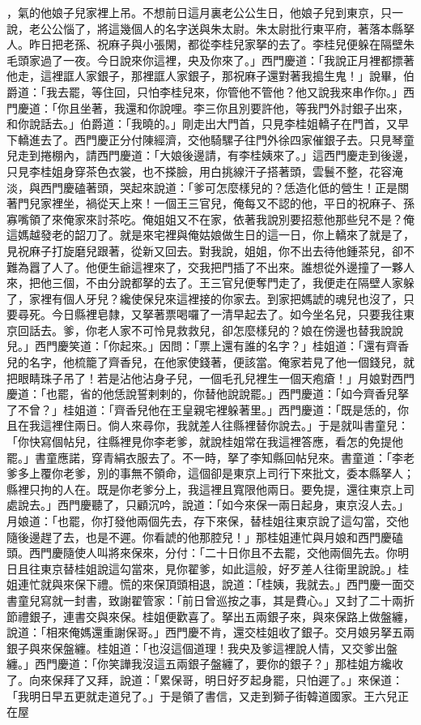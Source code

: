 \begin{showcontents}{}
，氣的他娘子兒家裡上吊。不想前日這月裏老公公生日，他娘子兒到東京，只一說，老公公惱了，將這幾個人的名字送與朱太尉。朱太尉批行東平府，著落本縣拏人。昨日把老孫、祝麻子與小張閑，都從李桂兒家拏的去了。李桂兒便躲在隔壁朱毛頭家過了一夜。今日說來你這裡，央及你來了。」西門慶道：「我說正月裡都摽著他走，這裡誆人家銀子，那裡誆人家銀子，那祝麻子還對著我搗生鬼！」說畢，伯爵道：「我去罷，等住回，只怕李桂兒來，你管他不管他？他又說我來串作你。」西門慶道：「你且坐著，我還和你說哩。李三你且別要許他，等我門外討銀子出來，和你說話去。」伯爵道：「我曉的。」剛走出大門首，只見李桂姐轎子在門首，又早下轎進去了。西門慶正分付陳經濟，交他騎騾子往門外徐四家催銀子去。只見琴童兒走到捲棚內，請西門慶道：「大娘後邊請，有李桂姨來了。」這西門慶走到後邊，只見李桂姐身穿茶色衣裳，也不搽臉，用白挑線汗子搭著頭，雲鬟不整，花容淹淡，與西門慶磕著頭，哭起來說道：「爹可怎麼樣兒的？恁造化低的營生！正是關著門兒家裡坐，禍從天上來！一個王三官兒，俺每又不認的他，平日的祝麻子、孫寡嘴領了來俺家來討茶吃。俺姐姐又不在家，依著我說別要招惹他那些兒不是？俺這媽越發老的韶刀了。就是來宅裡與俺姑娘做生日的這一日，你上轎來了就是了，見祝麻子打旋磨兒跟著，從新又回去。對我說，姐姐，你不出去待他鍾茶兒，卻不難為囂了人了。他便生爺這裡來了，交我把門插了不出來。誰想從外邊撞了一夥人來，把他三個，不由分說都拏的去了。王三官兒便奪門走了，我便走在隔壁人家躲了，家裡有個人牙兒？纔使保兒來這裡接的你家去。到家把媽諕的魂兒也沒了，只要尋死。今日縣裡皂隸，又拏著票喝囉了一清早起去了。如今坐名兒，只要我往東京回話去。爹，你老人家不可怜見救救兒，卻怎麼樣兒的？娘在傍邊也替我說說兒。」西門慶笑道：「你起來。」因問：「票上還有誰的名字？」桂姐道：「還有齊香兒的名字，他梳籠了齊香兒，在他家使錢著，便該當。俺家若見了他一個錢兒，就把眼睛珠子吊了！若是沾他沾身子兒，一個毛孔兒裡生一個天疱瘡！」月娘對西門慶道：「也罷，省的他恁說誓剌剌的，你替他說說罷。」西門慶道：「如今齊香兒拏了不曾？」桂姐道：「齊香兒他在王皇親宅裡躲著里。」西門慶道：「既是恁的，你且在我這裡住兩日。倘人來尋你，我就差人往縣裡替你說去。」于是就叫書童兒：「你快寫個帖兒，往縣裡見你李老爹，就說桂姐常在我這裡答應，看怎的免提他罷。」書童應諾，穿青絹衣服去了。不一時，拏了李知縣回帖兒來。書童道：「李老爹多上覆你老爹，別的事無不領命，這個卻是東京上司行下來批文，委本縣拏人；縣裡只拘的人在。既是你老爹分上，我這裡且寬限他兩日。要免提，還往東京上司處說去。」西門慶聽了，只顧沉吟，說道：「如今來保一兩日起身，東京沒人去。」月娘道：「也罷，你打發他兩個先去，存下來保，替桂姐往東京說了這勾當，交他隨後邊趕了去，也是不遲。你看諕的他那腔兒！」那桂姐連忙與月娘和西門慶磕頭。西門慶隨使人叫將來保來，分付：「二十日你且不去罷，交他兩個先去。你明日且往東京替桂姐說這勾當來，見你翟爹，如此這般，好歹差人往衛里說說。」桂姐連忙就與來保下禮。慌的來保頂頭相退，說道：「桂姨，我就去。」西門慶一面交書童兒寫就一封書，致謝翟管家：「前日曾巡按之事，其是費心。」又封了二十兩折節禮銀子，連書交與來保。桂姐便歡喜了。拏出五兩銀子來，與來保路上做盤纏，說道：「相來俺媽還重謝保哥。」西門慶不肯，還交桂姐收了銀子。交月娘另拏五兩銀子與來保盤纏。桂姐道：「也沒這個道理！我央及爹這裡說人情，又交爹出盤纏。」西門慶道：「你笑譁我沒這五兩銀子盤纏了，要你的銀子？」那桂姐方纔收了。向來保拜了又拜，說道：「累保哥，明日好歹起身罷，只怕遲了。」來保道：「我明日早五更就走道兒了。」于是領了書信，又走到獅子街韓道國家。王六兒正在屋
\end{showcontents}
